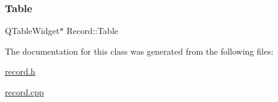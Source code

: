 \mbox{\label{class_record_a09a1c40c5b575561e3979ea0ea650110}} 
\subsubsection{\texorpdfstring{Table}{Table}}
{\footnotesize\ttfamily Q\+Table\+Widget$\ast$ Record\+::\+Table\hspace{0.3cm}{\ttfamily [private]}}



The documentation for this class was generated from the following files\+:\begin{DoxyCompactItemize}
\item 
\mbox{\hyperlink{record_8h}{record.\+h}}\item 
\mbox{\hyperlink{record_8cpp}{record.\+cpp}}\end{DoxyCompactItemize}
